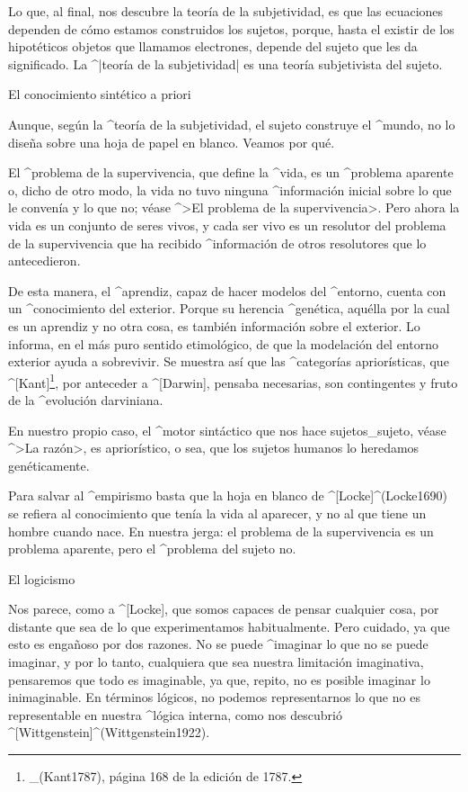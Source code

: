 
Lo que, al final, nos descubre la teoría de la subjetividad, es que las
ecuaciones dependen de cómo estamos construidos los sujetos, porque,
hasta el existir de los hipotéticos objetos que llamamos electrones,
depende del sujeto que les da significado. La ^|teoría de la
subjetividad| es una teoría subjetivista del sujeto.


\Section El conocimiento sintético a priori

Aunque, según la ^{teoría de la subjetividad}, el sujeto construye el
^{mundo}, no lo diseña sobre una hoja de papel en blanco. Veamos por
qué.

El ^{problema de la supervivencia}, que define la ^{vida}, es un
^{problema aparente} o, dicho de otro modo, la vida no tuvo ninguna
^{información} inicial sobre lo que le convenía y lo que no; véase ^>El
problema de la supervivencia>. Pero ahora la vida es un conjunto de
seres vivos, y cada ser vivo es un resolutor del problema de la
supervivencia que ha recibido ^{información} de otros resolutores que lo
antecedieron.

De esta manera, el ^{aprendiz}, capaz de hacer modelos del ^{entorno},
cuenta con un ^{conocimiento}  del exterior. Porque su
herencia ^{genética}, aquélla por la cual es un aprendiz y no otra cosa,
es también información sobre el exterior. Lo informa, en el más puro
sentido etimológico, de que la modelación del entorno exterior ayuda a
sobrevivir. Se muestra así que las ^{categorías} apriorísticas, que
^[Kant]\footnote{_(Kant1787), página 168 de la edición de 1787.}, por
anteceder a ^[Darwin], pensaba necesarias, son contingentes y fruto de
la ^{evolución} darviniana.

En nuestro propio caso, el ^{motor sintáctico} que nos hace
sujetos_{sujeto}, véase ^>La razón>, es apriorístico, o sea,
que los sujetos humanos lo heredamos genéticamente.

Para salvar al ^{empirismo} basta que la hoja en blanco de
^[Locke]^(Locke1690) se refiera al conocimiento que tenía la vida al
aparecer, y no al que tiene un hombre cuando nace. En nuestra jerga: el
problema de la supervivencia es un problema aparente, pero el ^{problema
del sujeto} no.


\Section El logicismo

Nos parece, como a ^[Locke], que somos capaces de pensar cualquier cosa,
por distante que sea de lo que experimentamos habitualmente. Pero
cuidado, ya que esto es engañoso por dos razones.
\beginpoints
\point No se puede ^{imaginar} lo que no se puede imaginar, y por lo
tanto, cualquiera que sea nuestra limitación imaginativa, pensaremos que
todo es imaginable, ya que, repito, no es posible imaginar lo
inimaginable. En términos lógicos, no podemos representarnos lo que no
es representable en nuestra ^{lógica interna}, como nos descubrió
^[Wittgenstein]^(Wittgenstein1922).

